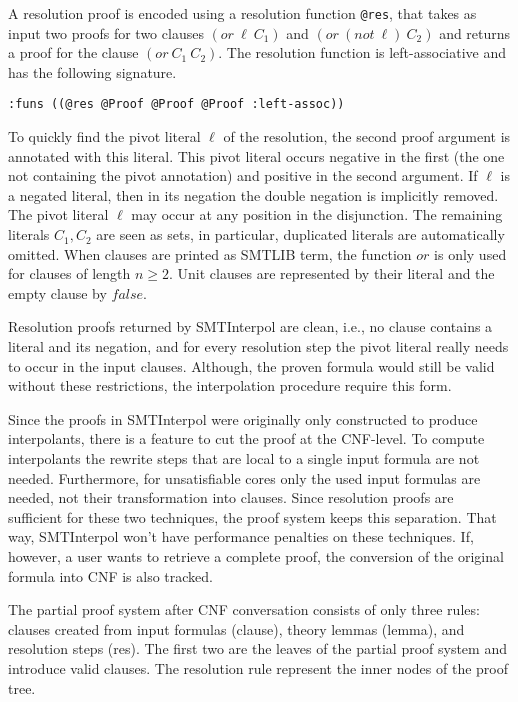 \documentclass[a4paper]{article}
\newcommand\si{SMTInterpol\xspace}
\begin{document}
A resolution proof is encoded using a resolution function \verb+@res+, that
takes as input two proofs for two clauses $(or\ \ell\ C_1)$ and
$(or\ (not\ \ell)\ C_2)$ and returns a proof for the clause $(or\ C_1\ C_2)$.
The resolution function is
left-associative and has the following  signature.

\begin{verbatim}
:funs ((@res @Proof @Proof @Proof :left-assoc))
\end{verbatim}

To quickly find the pivot literal $\ell$ of the resolution, the second
proof argument is annotated with this literal.  This pivot literal
occurs negative in the first (the one not containing the pivot
annotation) and positive in the second argument.  If $\ell$ is a
negated literal, then in its negation the double negation is
implicitly removed.  The pivot literal $\ell$ may occur at any
position in the disjunction.  The remaining literals $C_1,C_2$ are
seen as sets, in particular, duplicated literals are automatically
omitted.  When clauses are printed as SMTLIB term, the function $or$
is only used for clauses of length $n\geq 2$.  Unit clauses are
represented by their literal and the empty clause by $false$.

Resolution proofs returned by \si are clean, i.e., no clause contains
a literal and its negation, and for every resolution step the pivot
literal really needs to occur in the input clauses.  Although, the
proven formula would still be valid without these restrictions, the
interpolation procedure require this form.

Since the proofs in \si were originally only constructed to produce
interpolants, there is a feature to cut the proof at the CNF-level.
To compute interpolants the rewrite steps that are local to a single
input formula are not needed.  Furthermore, for unsatisfiable cores
only the used input formulas are needed, not their transformation into
clauses.  Since resolution proofs are sufficient for these two
techniques, the proof system keeps this separation.  That way, \si
won't have performance penalties on these techniques.  If, however, a
user wants to retrieve a complete proof, the conversion of the
original formula into CNF is also tracked.

The partial proof system after CNF conversation consists of only three
rules: clauses created from input formulas (clause), theory lemmas
(lemma), and resolution steps (res).  The first two are the leaves of
the partial proof system and introduce valid clauses.  The resolution
rule represent the inner nodes of the proof tree.
\end{document}
